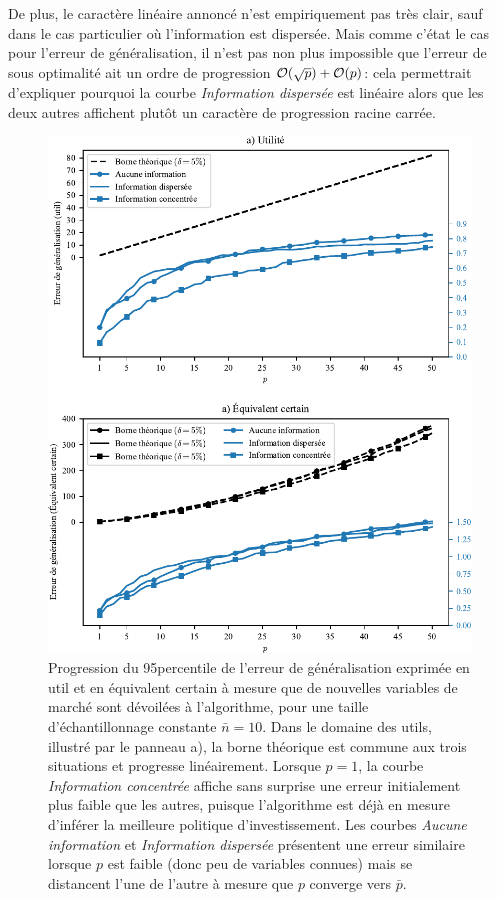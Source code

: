 De plus, le caractère linéaire annoncé n'est empiriquement pas très clair, sauf dans le
cas particulier où l'information est dispersée. Mais comme c'état le cas pour l'erreur de
généralisation, il n'est pas non plus impossible que l'erreur de sous optimalité ait un
ordre de progression $\mathcal O(\sqrt{p}) + \mathcal O(p)$: cela permettrait d'expliquer pourquoi
la courbe \textit{Information dispersée} est linéaire alors que les deux autres affichent
plutôt un caractère de progression racine carrée.
\newpage

\begin{figure}[h!]
  \centering
  \includegraphics[width=1\textwidth]{../experiments/fig/pconst_infogen2.pdf}
  \caption[Erreur de généralisation en fonction de $p$]{Progression du 95\ieme percentile
    de l'erreur de généralisation exprimée en util et en équivalent certain à mesure que
    de nouvelles variables de marché sont dévoilées à l'algorithme, pour une taille
    d'échantillonnage constante $\bar n = 10$. Dans le domaine des utils, illustré par le
    panneau a), la borne théorique est commune aux trois situations et progresse
    linéairement. Lorsque $p=1$, la courbe \textit{Information concentrée} affiche sans
    surprise une erreur initialement plus faible que les autres, puisque l'algorithme est
    déjà en mesure d'inférer la meilleure politique d'investissement. Les courbes
    \textit{Aucune information} et \textit{Information dispersée} présentent une erreur
    similaire lorsque $p$ est faible (donc peu de variables connues) mais se distancent
    l'une de l'autre à mesure que $p$ converge vers $\bar p$.}
  \label{fig_pconst_infogen}
\end{figure}

